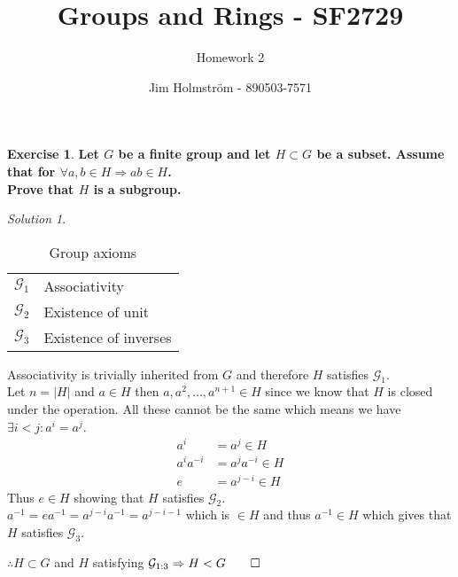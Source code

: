 \documentclass[a4paper,twoside=false,abstract=false,numbers=noenddot,
titlepage=false,headings=small,parskip=half,version=last]{scrartcl}
\author{Jim Holmström - 890503-7571}
\title{Groups and Rings - SF2729}
\subtitle{Homework 2}
\theoremstyle{definition}
\newtheorem{exercise}{Exercise}
\theoremstyle{remark}
\newtheorem*{solution}{Solution}
\newcommand{\GG}{\ensuremath{\mathcal{G}}}
\begin{document}
\maketitle
\thispagestyle{empty}

\begin{exercise}
{\bf
Let $G$ be a finite group and let $H \subset G$ be a subset. Assume that for $\forall a,b \in H \Rightarrow ab \in H$. \\
Prove that $H$ is a subgroup.
}
\end{exercise}
\begin{solution}
\hspace{1px}\linebreak %
\begin{table}[h!]
    \begin{center}
        \begin{tabular}{r l}
            $\GG_1$ & Associativity \\
            $\GG_2$ & Existence of unit \\
            $\GG_3$ & Existence of inverses \\
        \end{tabular}
    \end{center}
    \caption{Group axioms}
\end{table}

Associativity is trivially inherited from $G$ and therefore $H$ satisfies $\GG_1$.\\
Let $n = |H|$ and $a \in H$ then $a,a^2,\dots,a^{n+1} \in H$ since we know that $H$ is closed under the operation.
All these cannot be the same which means we have $\exists i<j : a^i=a^j$.
\begin{align*}
    a^i &= a^j \in H \\
    a^ia^{-i} &= a^ja^{-i}  \in H \\
    e &= a^{j-i}  \in H
\end{align*}
Thus $e \in H$ showing that $H$ satisfies $\GG_2$.\\
$a^{-1}=ea^{-1}=a^{j-i}a^{-1}=a^{j-i-1}$ which is $\in H$ and thus $a^{-1} \in H$ which gives that $H$ satisfies $\GG_3$.

$\therefore H \subset G$ and $H$ satisfying $\GG_{1:3} \Rightarrow H < G \qed$ 

\end{solution}

\end{document}
